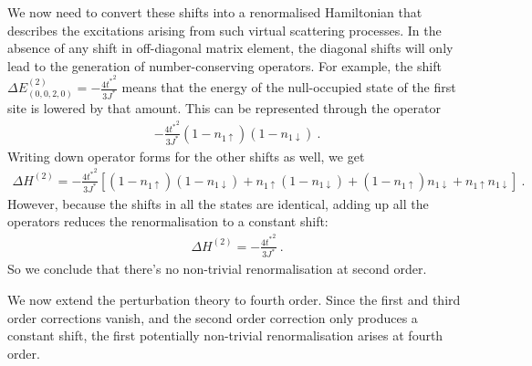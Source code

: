 We now need to convert these shifts into a renormalised Hamiltonian that describes the excitations arising from such virtual scattering processes. In the absence of any shift in off-diagonal matrix element, the diagonal shifts will only lead to the generation of number-conserving operators. For example, the shift \(\Delta E^{(2)}_{(0,0,2,0)} = -\frac{4{t^*}^2}{3J^*}\) means that the energy of the null-occupied state of the first site is lowered by that amount. This can be represented through the operator
\begin{equation}\begin{aligned}
	-\frac{4{t^*}^2}{3J^*} (1 - n_{1 \uparrow})(1 - n_{1 \downarrow})~.
\end{aligned}\end{equation}
Writing down operator forms for the other shifts as well, we get
\begin{equation}\begin{aligned}
	\Delta H^{(2)} = -\frac{4{t^*}^2}{3J^*} \left[(1 - n_{1 \uparrow})(1 - n_{1 \downarrow}) + n_{1 \uparrow}(1 - n_{1 \downarrow}) + (1 - n_{1 \uparrow})n_{1 \downarrow} + n_{1 \uparrow}n_{1 \downarrow}\right]~.
\end{aligned}\end{equation}
However, because the shifts in all the states are identical, adding up all the operators reduces the renormalisation to a constant shift:
\begin{equation}\begin{aligned}
	\Delta H^{(2)} = -\frac{4{t^*}^2}{3J^*}~.
\end{aligned}\end{equation}
So we conclude that there's no non-trivial renormalisation at second order.

We now extend the perturbation theory to fourth order. Since the first and third order corrections vanish, and the second order correction only produces a constant shift, the first potentially non-trivial renormalisation arises at fourth order.

